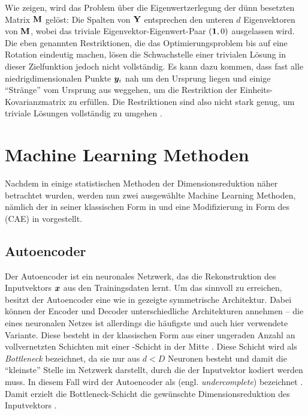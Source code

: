 Wie \textcite[3 -- 4]{Ghojogh.2020} zeigen, wird das Problem über die Eigenwertzerlegung der dünn
besetzten Matrix $\mathbf{M}$ gelöst: Die Spalten von $\mathbf{Y}$ entsprechen den unteren $d$
Eigenvektoren von $\mathbf{M}$, wobei das triviale Eigenvektor-Eigenwert-Paar $(\bm{1}, 0)$ ausgelassen
wird. Die eben genannten Restriktionen, die das Optimierungsproblem bis auf eine Rotation eindeutig
machen, lösen die Schwachstelle einer trivialen Lösung in dieser Zielfunktion jedoch nicht
vollständig. Es kann dazu kommen, dass fast alle niedrigdimensionalen Punkte $\bm{y}_i$ nah um
den Ursprung liegen und einige \enquote{Stränge} vom Ursprung aus weggehen, um die Restriktion der
Einheits-Kovarianzmatrix zu erfüllen. Die Restriktionen sind also nicht stark genug, um triviale
Lösungen vollständig zu umgehen \parencite[vgl.][23]{vanderMaaten.2009}.

\section{Machine Learning Methoden}
\label{ch:MethodenDerDimRed:modern}
Nachdem in  einige statistischen Methoden der
Dimensionsreduktion näher betrachtet wurden, werden nun zwei ausgewählte Machine Learning Methoden,
nämlich der  in seiner klassischen Form in
 und eine Modifizierung in Form des  (CAE) in  vorgestellt.

\subsection{Autoencoder}
\label{ch:MethodenDerDimRed:ML:AE}

Der Autoencoder ist ein neuronales Netzwerk, das die Rekonstruktion des Inputvektors $\bm{x}$ aus
den Trainingsdaten lernt. Um das sinnvoll zu erreichen, besitzt der Autoencoder eine wie in
 gezeigte symmetrische Architektur.
 Dabei können der Encoder und Decoder unterschiedliche
Architekturen annehmen -- die eines neuronalen Netzes ist allerdings die häufigste und auch hier
verwendete Variante. Diese besteht in der klassischen Form aus einer ungeraden Anzahl an
vollvernetzten Schichten mit einer -Schicht in der Mitte \parencite[2]{Bank.2020}. Diese Schicht wird als \textit{Bottleneck} bezeichnet, da sie nur aus $d < D$
Neuronen besteht und damit die \enquote{kleinste} Stelle im Netzwerk darstellt, durch die der
Inputvektor kodiert werden muss. In diesem Fall wird der Autoencoder als 
(engl. \textit{undercomplete}) bezeichnet \parencite[503]{Goodfellow.2016}.
Damit erzielt die Bottleneck-Schicht die gewünschte Dimensionsreduktion des Inputvektors \parencites[502]{Goodfellow.2016}[2]{Bank.2020}.

